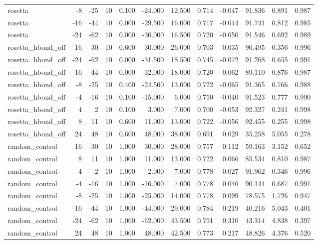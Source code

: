 \begin{table}
\begin{tabular}{lrrrrrrrrrrr}
rosetta & -8 & -25 & 10 & 0.100 & -24.000 & 12.500 & 0.714 & -0.047 & 91.836 & 0.891 & 0.987 \\
rosetta & -16 & -44 & 10 & 0.000 & -29.500 & 16.000 & 0.717 & -0.044 & 91.741 & 0.812 & 0.985 \\
rosetta & -24 & -62 & 10 & 0.000 & -30.000 & 16.500 & 0.720 & -0.050 & 91.546 & 0.692 & 0.989 \\
rosetta\_hbond\_off & 16 & 30 & 10 & 0.600 & 30.000 & 26.000 & 0.703 & -0.035 & 90.495 & 0.356 & 0.996 \\
rosetta\_hbond\_off & -24 & -62 & 10 & 0.000 & -31.500 & 18.500 & 0.745 & -0.072 & 91.268 & 0.655 & 0.991 \\
rosetta\_hbond\_off & -16 & -44 & 10 & 0.000 & -32.000 & 18.000 & 0.720 & -0.062 & 89.110 & 0.876 & 0.987 \\
rosetta\_hbond\_off & -8 & -25 & 10 & 0.400 & -24.500 & 13.000 & 0.722 & -0.065 & 91.365 & 0.766 & 0.988 \\
rosetta\_hbond\_off & -4 & -16 & 10 & 0.100 & -15.000 & 6.000 & 0.750 & -0.040 & 91.523 & 0.777 & 0.990 \\
rosetta\_hbond\_off & 4 & 2 & 10 & 0.100 & 3.000 & 7.000 & 0.700 & -0.053 & 92.327 & 0.241 & 0.998 \\
rosetta\_hbond\_off & 8 & 11 & 10 & 0.600 & 11.000 & 13.000 & 0.722 & -0.056 & 92.455 & 0.255 & 0.998 \\
rosetta\_hbond\_off & 24 & 48 & 10 & 0.600 & 48.000 & 38.000 & 0.691 & 0.029 & 35.258 & 5.055 & 0.278 \\
random\_control & 16 & 30 & 10 & 1.000 & 30.000 & 28.000 & 0.757 & 0.112 & 59.163 & 3.152 & 0.652 \\
random\_control & 8 & 11 & 10 & 1.000 & 11.000 & 13.000 & 0.722 & 0.066 & 85.534 & 0.810 & 0.987 \\
random\_control & 4 & 2 & 10 & 1.000 & 2.000 & 7.000 & 0.778 & 0.027 & 91.962 & 0.346 & 0.996 \\
random\_control & -4 & -16 & 10 & 1.000 & -16.000 & 7.000 & 0.778 & 0.046 & 90.144 & 0.687 & 0.991 \\
random\_control & -8 & -25 & 10 & 1.000 & -25.000 & 14.000 & 0.778 & 0.099 & 78.575 & 1.726 & 0.947 \\
random\_control & -16 & -44 & 10 & 1.000 & -44.000 & 29.000 & 0.784 & 0.219 & 40.216 & 5.043 & 0.401 \\
random\_control & -24 & -62 & 10 & 1.000 & -62.000 & 43.500 & 0.791 & 0.310 & 43.314 & 4.838 & 0.397 \\
random\_control & 24 & 48 & 10 & 1.000 & 48.000 & 42.500 & 0.773 & 0.217 & 48.826 & 4.376 & 0.520 \\
\bottomrule
\end{tabular}
\end{table}
